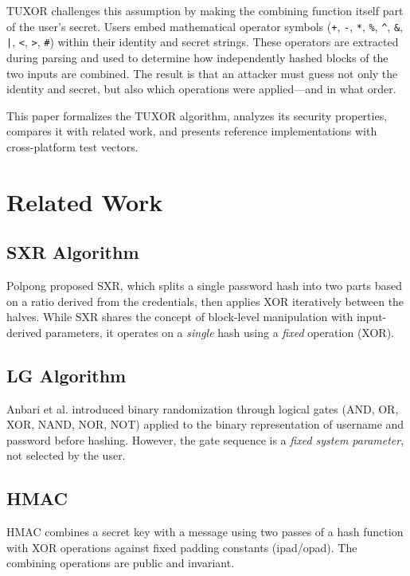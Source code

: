 \documentclass[11pt,a4paper]{article}
\begin{document}
TUXOR challenges this assumption by making the combining function itself part of the user's secret. Users embed mathematical operator symbols (\texttt{+}, \texttt{-}, \texttt{*}, \texttt{\%}, \texttt{\^{}}, \texttt{\&}, \texttt{|}, \texttt{<}, \texttt{>}, \texttt{\#}) within their identity and secret strings. These operators are extracted during parsing and used to determine how independently hashed blocks of the two inputs are combined. The result is that an attacker must guess not only the identity and secret, but also which operations were applied---and in what order.

This paper formalizes the TUXOR algorithm, analyzes its security properties, compares it with related work, and presents reference implementations with cross-platform test vectors.

\section{Related Work}

\subsection{SXR Algorithm}
Polpong \cite{polpong2021sxr} proposed SXR, which splits a single password hash into two parts based on a ratio derived from the credentials, then applies XOR iteratively between the halves. While SXR shares the concept of block-level manipulation with input-derived parameters, it operates on a \textit{single} hash using a \textit{fixed} operation (XOR).

\subsection{LG Algorithm}
Anbari et al. \cite{anbari2024lg} introduced binary randomization through logical gates (AND, OR, XOR, NAND, NOR, NOT) applied to the binary representation of username and password before hashing. However, the gate sequence is a \textit{fixed system parameter}, not selected by the user.

\subsection{HMAC}
HMAC \cite{bellare1996hmac} combines a secret key with a message using two passes of a hash function with XOR operations against fixed padding constants (ipad/opad). The combining operations are public and invariant.
\end{document}

